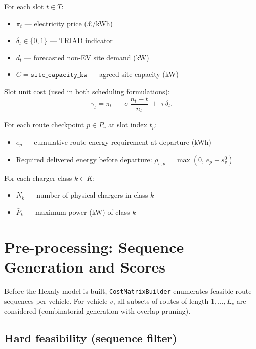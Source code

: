 \documentclass[11pt,a4paper]{article}
\newcommand{\1}{\mathbf{1}}
\begin{document}
For each slot $t \in T$:
\begin{itemize}[nosep]
  \item $\pi_t$ --- electricity price (£/kWh)
  \item $\delta_t \in \{0,1\}$ --- TRIAD indicator
  \item $d_t$ --- forecasted non-EV site demand (kW)
  \item $C = \texttt{site\_capacity\_kw}$ --- agreed site capacity (kW)
\end{itemize}

Slot unit cost (used in both scheduling formulations):
\begin{equation}
  \label{eq:slot-cost}
  \gamma_t = \pi_t \;+\; \sigma\,\frac{n_t - t}{n_t} \;+\; \tau\,\delta_t.
\end{equation}

For each route checkpoint $p \in P_v$ at slot index $t_p$:
\begin{itemize}[nosep]
  \item $e_p$ --- cumulative route energy requirement at departure (kWh)
  \item Required delivered energy before departure:
        $\rho_{v,p} = \max(0,\, e_p - s_v^0)$
\end{itemize}

For each charger class $k \in K$:
\begin{itemize}[nosep]
  \item $N_k$ --- number of physical chargers in class $k$
  \item $\bar{P}_k$ --- maximum power (kW) of class $k$
\end{itemize}

\section{Pre-processing: Sequence Generation and Scores}

Before the Hexaly model is built, \texttt{CostMatrixBuilder} enumerates feasible
route sequences per vehicle. For vehicle $v$, all subsets of routes of length
$1,\ldots,L_v$ are considered (combinatorial generation with overlap pruning).

\subsection{Hard feasibility (sequence filter)}
\end{document}
